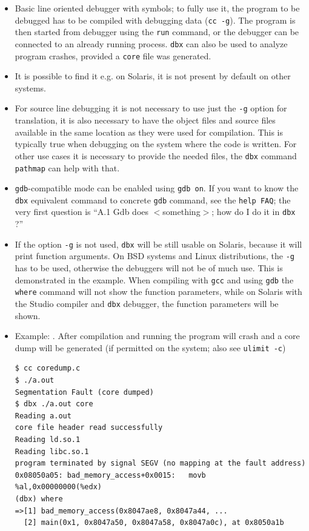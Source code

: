\begin{itemize}
\item Basic line oriented debugger with symbols; to fully use it, the program to
be debugged has to be compiled with debugging data (\texttt{cc -g}). The program
is then started from debugger using the \texttt{run} command, or the debugger
can be connected to an already running process. \texttt{dbx} can also be used to
analyze program crashes, provided a \texttt{core} file was generated.
\item It is possible to find it e.g. on Solaris, it is not present by default
on other systems.
\item For source line debugging it is not necessary to use just the \texttt{-g}
option for translation, it is also necessary to have the object files and source
files available in the same location as they were used for compilation.
This is typically true when debugging on the system where the code is written.
For other use cases it is necessary to provide the needed files, the
\texttt{dbx} command \texttt{pathmap} can help with that.
\item \texttt{gdb}-compatible mode can be enabled using \texttt{gdb on}.
If you want to know the \texttt{dbx} equivalent command to concrete
\texttt{gdb} command, see the \texttt{help FAQ}; the very first question is
``A.1  Gdb does $<$something$>$; how do I do it in \texttt{dbx} ?''
\item If the option \texttt{-g} is not used, \texttt{dbx} will be still usable
on Solaris, because it will print function arguments. On BSD systems and Linux
distributions, the \texttt{-g} has to be used, otherwise the debuggers will not
be of much use. This is demonstrated in the  example.
When compiling with \texttt{gcc} and using \texttt{gdb} the \texttt{where}
command will not show the function parameters, while on Solaris with the Studio
compiler and \texttt{dbx} debugger, the function parameters will be shown.
\item Example: . After compilation and running the
program will crash and a core dump will be generated (if permitted on the system;
also see \texttt{ulimit -c})

\begin{verbatim}
$ cc coredump.c
$ ./a.out 
Segmentation Fault (core dumped)
$ dbx ./a.out core
Reading a.out
core file header read successfully
Reading ld.so.1
Reading libc.so.1
program terminated by signal SEGV (no mapping at the fault address)
0x08050a05: bad_memory_access+0x0015:   movb     %al,0x00000000(%edx)
(dbx) where                                                                  
=>[1] bad_memory_access(0x8047ae8, 0x8047a44, ...
  [2] main(0x1, 0x8047a50, 0x8047a58, 0x8047a0c), at 0x8050a1b 
\end{verbatim}


\end{itemize}
